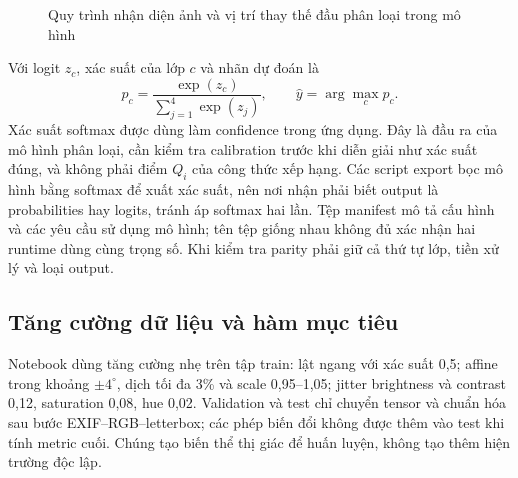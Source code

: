 \begin{figure}[htbp]\centering
{}
\caption{Quy trình nhận diện ảnh và vị trí thay thế đầu phân loại trong mô hình}
\label{fig:image-model-design}
\end{figure}

Với logit $z_c$, xác suất của lớp $c$ và nhãn dự đoán là
\begin{equation}
 p_c=\frac{\exp(z_c)}{\sum_{j=1}^{4}\exp(z_j)},\qquad \widehat y=\arg\max_c p_c.
 \label{eq:softmax}
\end{equation}
Xác suất softmax được dùng làm confidence trong ứng dụng. Đây là đầu ra của mô hình phân loại, cần kiểm tra calibration trước khi diễn giải như xác suất đúng, và không phải điểm $Q_i$ của công thức xếp hạng. Các script export bọc mô hình bằng softmax để xuất xác suất, nên nơi nhận phải biết output là probabilities hay logits, tránh áp softmax hai lần. Tệp manifest mô tả cấu hình và các yêu cầu sử dụng mô hình; tên tệp giống nhau không đủ xác nhận hai runtime dùng cùng trọng số. Khi kiểm tra parity phải giữ cả thứ tự lớp, tiền xử lý và loại output.

\subsection{Tăng cường dữ liệu và hàm mục tiêu}
Notebook dùng tăng cường nhẹ trên tập train: lật ngang với xác suất 0,5; affine trong khoảng $\pm4^\circ$, dịch tối đa 3\% và scale 0,95--1,05; jitter brightness và contrast 0,12, saturation 0,08, hue 0,02. Validation và test chỉ chuyển tensor và chuẩn hóa sau bước EXIF--RGB--letterbox; các phép biến đổi không được thêm vào test khi tính metric cuối. Chúng tạo biến thể thị giác để huấn luyện, không tạo thêm hiện trường độc lập.

